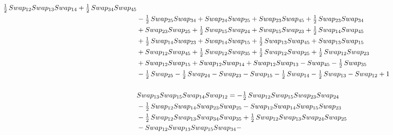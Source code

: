 \documentclass[10pt,a4paper]{amsart}
\begin{document}
\begin{align*}
        \tfrac12\,\textnormal{Swap}_{12} \textnormal{Swap}_{13} \textnormal{Swap}_{14} + \tfrac12\,\textnormal{Swap}_{34} \textnormal{Swap}_{45}\\ & - \tfrac12\,\textnormal{Swap}_{25} \textnormal{Swap}_{34} + \textnormal{Swap}_{24} \textnormal{Swap}_{25} + \textnormal{Swap}_{23} \textnormal{Swap}_{45} +
        \tfrac12\,\textnormal{Swap}_{23} \textnormal{Swap}_{34}\\ & + \textnormal{Swap}_{23} \textnormal{Swap}_{25} + \tfrac12\,\textnormal{Swap}_{15} \textnormal{Swap}_{24} + \textnormal{Swap}_{15} \textnormal{Swap}_{23} + \tfrac12\,\textnormal{Swap}_{14} \textnormal{Swap}_{45}\\ & +
        \tfrac12\,\textnormal{Swap}_{14} \textnormal{Swap}_{23} + \textnormal{Swap}_{14} \textnormal{Swap}_{15} + \tfrac12\,\textnormal{Swap}_{13} \textnormal{Swap}_{45} + \textnormal{Swap}_{13} \textnormal{Swap}_{15}\\ & + \textnormal{Swap}_{12} \textnormal{Swap}_{45} + \tfrac12\,\textnormal{Swap}_{12} \textnormal{Swap}_{35} +
        \tfrac12\,\textnormal{Swap}_{12} \textnormal{Swap}_{25} + \tfrac12\,\textnormal{Swap}_{12} \textnormal{Swap}_{23}\\ & + \textnormal{Swap}_{12} \textnormal{Swap}_{15} + \textnormal{Swap}_{12} \textnormal{Swap}_{14} + \textnormal{Swap}_{12} \textnormal{Swap}_{13} - \textnormal{Swap}_{45} - \tfrac12\,\textnormal{Swap}_{35}\\ &
        - \tfrac12\,\textnormal{Swap}_{25} - \tfrac12\,\textnormal{Swap}_{24} - \textnormal{Swap}_{23} - \textnormal{Swap}_{15} - \tfrac12\,\textnormal{Swap}_{14} - \tfrac12\,\textnormal{Swap}_{13} - \textnormal{Swap}_{12} + 1\\
        \\
&\textnormal{Swap}_{13}   \textnormal{Swap}_{15}   \textnormal{Swap}_{14}   \textnormal{Swap}_{12} = -\tfrac12\,\textnormal{Swap}_{12} \textnormal{Swap}_{15} \textnormal{Swap}_{23} \textnormal{Swap}_{24} \\ & - \tfrac12\,\textnormal{Swap}_{12} \textnormal{Swap}_{14} \textnormal{Swap}_{23} \textnormal{Swap}_{25} - \textnormal{Swap}_{12} \textnormal{Swap}_{14} \textnormal{Swap}_{15} \textnormal{Swap}_{23}\\ & -
        \tfrac12\,\textnormal{Swap}_{12} \textnormal{Swap}_{13} \textnormal{Swap}_{34} \textnormal{Swap}_{35} + \tfrac12\,\textnormal{Swap}_{12} \textnormal{Swap}_{13} \textnormal{Swap}_{24} \textnormal{Swap}_{25}\\ & - \textnormal{Swap}_{12} \textnormal{Swap}_{13} \textnormal{Swap}_{15} \textnormal{Swap}_{34} -

\end{align*}
\end{document}
